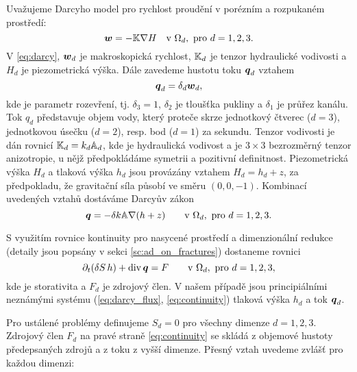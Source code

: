 

Uvažujeme Darcyho model pro rychlost proudění v porézním a rozpukaném prostředí:
\begin{equation}
    \label{eq:darcy}
    \mathbf{\boldsymbol{w}} = -{\mathbb{K}} \nabla H \quad\text{v }\Omega_d,\ \text{pro $d=1,2,3$}.
\end{equation}
V \eqref{eq:darcy}, $\mathbf{\boldsymbol{w}}_d$  je makroskopická rychlost,
${\mathbb{K}}_d$ je tenzor hydraulické vodivosti a $H_d$  je piezometrická výška. Dále zavedeme hustotu toku $\mathbf{\boldsymbol{q}}_d$ 
  vztahem
\[
    \mathbf{\boldsymbol{q}}_d = \delta_d \mathbf{\boldsymbol{w}}_d,
\]
kde
 je parametr rozevření, tj. $\delta_3=1$, $\delta_2$  je tloušťka pukliny a $\delta_1$  je průřez kanálu.
Tok $q_d$ představuje objem vody, který proteče skrze jednotkový čtverec ($d=3$),
jednotkovou úsečku ($d=2$), resp. bod ($d=1$) za sekundu. 
Tenzor vodivosti je dán rovnicí 
${\mathbb{K}}_d = k_d {\mathbb{A}}_d$, kde
 je hydraulická vodivost  a
 je
$3\times 3$ bezrozměrný tenzor anizotropie, u nějž předpokládáme symetrii a pozitivní definitnost. Piezometrická výška $H_d$ a tlaková výška
$h_d$ jsou provázány vztahem $H_d = h_d + z$, za předpokladu, že gravitační síla působí ve směru $(0,0,-1)$. 
Kombinací uvedených vztahů dostáváme Darcyův zákon
\begin{equation}
    \label{eq:darcy_flux}
    \vc q = -\delta k\tn A \grad (h+z)  \qquad\text{v }\Omega_d,\ \text{pro $d=1,2,3$}.
\end{equation}

S využitím rovnice kontinuity pro nasycené prostředí a dimenzionální redukce (detaily jsou popsány v sekci \ref{sc:ad_on_fractures}) dostaneme rovnici
\begin{equation}
    \label{eq:continuity}
    \prtl_t (\delta S\, h) + \div \vc q = F \qquad \text{v }\Omega_d,\ \text{pro $d=1,2,3$},
\end{equation}
kde   je storativita a $F_d$  je zdrojový člen. V našem případě jsou principiálními neznámými systému
(\ref{eq:darcy_flux}, \ref{eq:continuity}) tlaková výška $h_d$ a tok $\mathbf{\boldsymbol{q}}_d$.


Pro ustálené problémy definujeme $S_d=0$ pro všechny dimenze $d=1,2,3$.
Zdrojový člen $F_d$ na pravé straně \eqref{eq:continuity} se skládá z objemové hustoty předepsaných zdrojů
  a z toku z vyšší dimenze. 
Přesný vztah uvedeme zvlášť pro každou dimenzi:

